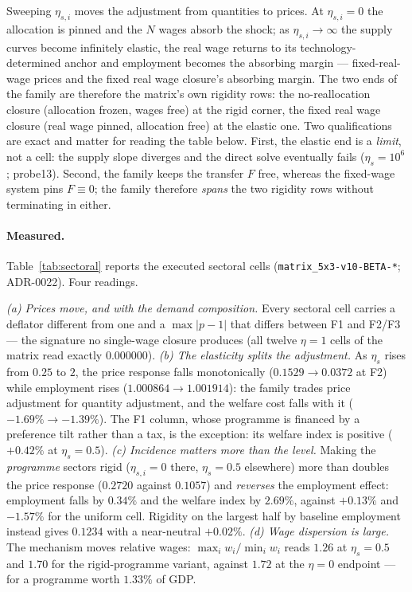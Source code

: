 \begin{remark}
Sweeping $\eta_{s,i}$ moves the adjustment from quantities to prices. At
$\eta_{s,i} = 0$ the allocation is pinned and the $N$ wages absorb the shock;
as $\eta_{s,i} \to \infty$ the supply curves become infinitely elastic, the
real wage returns to its technology-determined anchor and employment becomes
the absorbing margin --- fixed-real-wage prices and the fixed real wage
closure's absorbing margin. The
two ends of the family are therefore the matrix's own rigidity rows: the
no-reallocation closure
(allocation frozen, wages free) at the rigid corner, the fixed real wage
closure (real wage pinned,
allocation free) at the elastic one. Two qualifications are exact and matter
for reading the table below. First, the elastic end is a \emph{limit}, not a
cell: the supply slope diverges and the direct solve eventually fails
($\eta_s = 10^6$; probe13). Second, the family keeps the transfer $F$ free,
whereas the fixed-wage system pins $F \equiv 0$; the family therefore
\emph{spans} the two rigidity rows without terminating in either.
\end{remark}

\paragraph{Measured.} Table~\ref{tab:sectoral} reports the executed sectoral cells
(\texttt{matrix\_5x3-v10-BETA-*}; ADR-0022). Four readings.

\emph{(a) Prices move, and with the demand composition.} Every sectoral cell
carries a deflator different from one and a $\max|p-1|$ that differs between F1
and F2/F3 --- the signature no single-wage closure produces (all twelve
$\eta = 1$ cells of the matrix read exactly $0.000000$).
\emph{(b) The elasticity splits the adjustment.} As $\eta_s$ rises from $0.25$
to $2$, the price response falls monotonically ($0.1529 \to 0.0372$ at F2)
while employment rises ($1.000864 \to 1.001914$): the family trades price
adjustment for quantity adjustment, and the welfare cost falls with it
($-1.69\% \to -1.39\%$). The F1 column, whose programme is financed by a
preference tilt rather than a tax, is the exception: its welfare index is
positive ($+0.42\%$ at $\eta_s = 0.5$).
\emph{(c) Incidence matters more than the level.} Making the \emph{programme}
sectors rigid ($\eta_{s,i} = 0$ there, $\eta_s = 0.5$ elsewhere) more than
doubles the price response ($0.2720$ against $0.1057$) and \emph{reverses} the
employment effect: employment falls by $0.34\%$ and the welfare index by
$2.69\%$, against $+0.13\%$ and $-1.57\%$ for the uniform cell. Rigidity on the
largest half by baseline employment instead gives $0.1234$ with a near-neutral
$+0.02\%$.
\emph{(d) Wage dispersion is large.} The mechanism moves relative wages:
$\max_i w_i / \min_i w_i$ reads $1.26$ at $\eta_s = 0.5$ and $1.70$ for the
rigid-programme variant, against $1.72$ at the $\eta = 0$ endpoint --- for a
programme worth $1.33\%$ of GDP.

